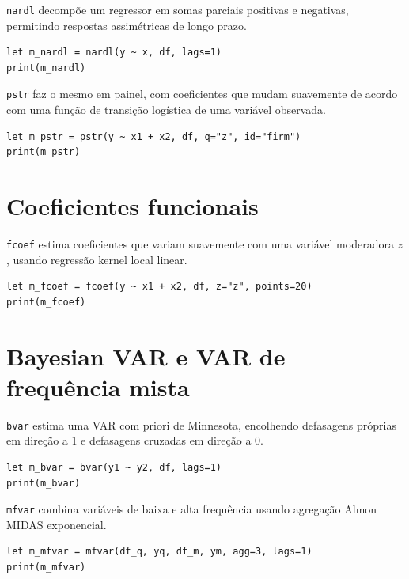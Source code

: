\texttt{nardl} decompõe um regressor em somas parciais positivas e negativas,
permitindo respostas assimétricas de longo prazo.

\begin{lstlisting}[caption={NARDL}]
let m_nardl = nardl(y ~ x, df, lags=1)
print(m_nardl)
\end{lstlisting}

\texttt{pstr} faz o mesmo em painel, com coeficientes que mudam suavemente de
acordo com uma função de transição logística de uma variável observada.

\begin{lstlisting}[caption={Regressão de Transição Suave em Painel}]
let m_pstr = pstr(y ~ x1 + x2, df, q="z", id="firm")
print(m_pstr)
\end{lstlisting}

\section{Coeficientes funcionais}

\texttt{fcoef} estima coeficientes que variam suavemente com uma variável
moderadora $z$, usando regressão kernel local linear.

\begin{lstlisting}[caption={Modelo de coeficientes funcionais}]
let m_fcoef = fcoef(y ~ x1 + x2, df, z="z", points=20)
print(m_fcoef)
\end{lstlisting}

\section{Bayesian VAR e VAR de frequência mista}

\texttt{bvar} estima uma VAR com priori de Minnesota, encolhendo defasagens
próprias em direção a 1 e defasagens cruzadas em direção a 0.

\begin{lstlisting}[caption={Bayesian VAR}]
let m_bvar = bvar(y1 ~ y2, df, lags=1)
print(m_bvar)
\end{lstlisting}

\texttt{mfvar} combina variáveis de baixa e alta frequência usando agregação
Almon MIDAS exponencial.

\begin{lstlisting}[caption={VAR de frequência mista}]
let m_mfvar = mfvar(df_q, yq, df_m, ym, agg=3, lags=1)
print(m_mfvar)
\end{lstlisting}

